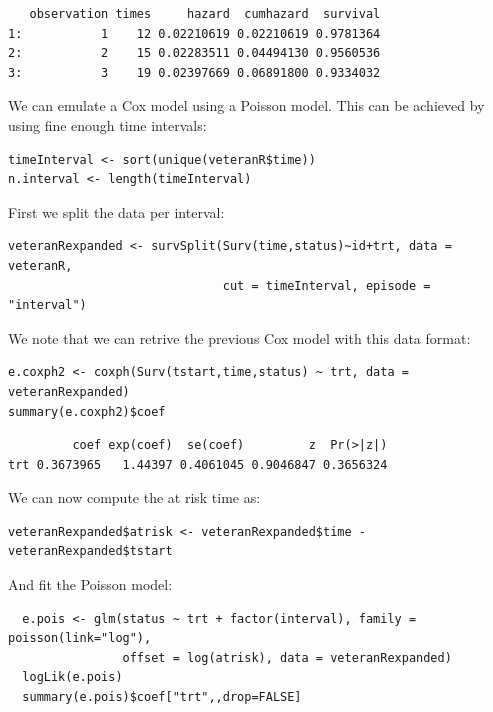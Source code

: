 \documentclass{article}
\begin{document}
\begin{verbatim}
   observation times     hazard  cumhazard  survival
1:           1    12 0.02210619 0.02210619 0.9781364
2:           2    15 0.02283511 0.04494130 0.9560536
3:           3    19 0.02397669 0.06891800 0.9334032
\end{verbatim}


We can emulate a Cox model using a Poisson model. This can be achieved
by using fine enough time intervals:
\lstset{language=r,label= ,caption= ,captionpos=b,numbers=none}
\begin{lstlisting}
timeInterval <- sort(unique(veteranR$time))
n.interval <- length(timeInterval)
\end{lstlisting}

First we split the data per interval:
\lstset{language=r,label= ,caption= ,captionpos=b,numbers=none}
\begin{lstlisting}
veteranRexpanded <- survSplit(Surv(time,status)~id+trt, data = veteranR,
                              cut = timeInterval, episode = "interval")
\end{lstlisting}

\clearpage

We note that we can retrive the previous Cox model with this data
format:
\lstset{language=r,label= ,caption= ,captionpos=b,numbers=none}
\begin{lstlisting}
e.coxph2 <- coxph(Surv(tstart,time,status) ~ trt, data = veteranRexpanded)
summary(e.coxph2)$coef
\end{lstlisting}

\begin{verbatim}
         coef exp(coef)  se(coef)         z  Pr(>|z|)
trt 0.3673965   1.44397 0.4061045 0.9046847 0.3656324
\end{verbatim}


We can now compute the at risk time as:
\lstset{language=r,label= ,caption= ,captionpos=b,numbers=none}
\begin{lstlisting}
veteranRexpanded$atrisk <- veteranRexpanded$time - veteranRexpanded$tstart
\end{lstlisting}

And fit the Poisson model:
\lstset{language=r,label= ,caption= ,captionpos=b,numbers=none}
\begin{lstlisting}
  e.pois <- glm(status ~ trt + factor(interval), family = poisson(link="log"),
                offset = log(atrisk), data = veteranRexpanded)
  logLik(e.pois)
  summary(e.pois)$coef["trt",,drop=FALSE]
\end{lstlisting}
\end{document}
